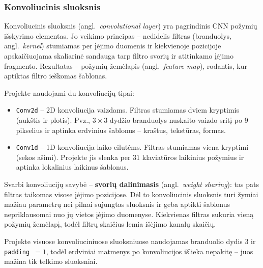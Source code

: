 \subsubsection{Konvoliucinis sluoksnis}
\label{subsubsec:konvoliucinis_sluoksnis}

Konvoliucinis sluoksnis (angl.~\textit{convolutional layer}) yra pagrindinis CNN požymių išskyrimo elementas. Jo veikimo principas – nedidelis filtras (branduolys, angl.~\textit{kernel}) stumiamas per įėjimo duomenis ir kiekvienoje pozicijoje apskaičiuojama skaliarinė sandauga tarp filtro svorių ir atitinkamo įėjimo fragmento. Rezultatas – požymių žemėlapis (angl.~\textit{feature map}), rodantis, kur aptiktas filtro ieškomas šablonas.

Projekte naudojami du konvoliucijų tipai:
\begin{itemize}
    \item \texttt{Conv2d} – 2D konvoliucija vaizdams. Filtras stumiamas dviem kryptimis (aukštis ir plotis). Pvz., $3 \times 3$ dydžio branduolys nuskaito vaizdo sritį po $9$ pikselius ir aptinka erdvinius šablonus – kraštus, tekstūras, formas.
    \item \texttt{Conv1d} – 1D konvoliucija laiko eilutėms. Filtras stumiamas viena kryptimi (sekos ašimi). Projekte jis slenka per $31$ klaviatūros laikinius požymius ir aptinka lokalinius laikinus šablonus.
\end{itemize}

Svarbi konvoliucijų savybė – \textbf{svorių dalinimasis} (angl.~\textit{weight sharing}): tas pats filtras taikomas visose įėjimo pozicijose. Dėl to konvoliucinis sluoksnis turi žymiai mažiau parametrų nei pilnai sujungtas sluoksnis ir geba aptikti šablonus nepriklausomai nuo jų vietos įėjimo duomenyse. Kiekvienas filtras sukuria vieną požymių žemėlapį, todėl filtrų skaičius lemia išėjimo kanalų skaičių.

Projekte visuose konvoliuciniuose sluoksniuose naudojamas branduolio dydis $3$ ir \texttt{padding}~$= 1$, todėl erdviniai matmenys po konvoliucijos išlieka nepakitę – juos mažina tik telkimo sluoksniai.
